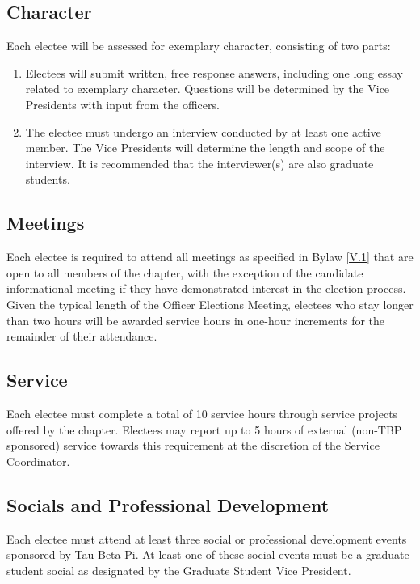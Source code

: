 
\subsection{Character} \label{B.1}

Each electee will be assessed for exemplary character, consisting of two parts:
\begin{enumerate}
    \item {} Electees will submit written, free response answers, including one long essay related to exemplary character. 
    Questions will be determined by the Vice Presidents with input from the officers.
    \item {} The electee must undergo an interview conducted by at least one active member. The Vice Presidents will determine the length and scope of the interview. 
    It is recommended that the interviewer(s) are also graduate students. 
\end{enumerate}


\subsection{Meetings} \label{B.2}

Each electee is required to attend all meetings as specified in Bylaw \ref{V.1} that are open to all members of the chapter, with the exception of the 
candidate informational meeting if they have demonstrated interest in the election process. Given the typical length of the Officer Elections Meeting, 
electees who stay longer than two hours will be awarded service hours in one-hour increments for the remainder of their attendance. 


\subsection{Service} \label{B.3}

Each electee must complete a total of 10 service hours through service projects offered by the chapter. 
Electees may report up to 5 hours of external (non-TBP sponsored) service towards this requirement at the discretion of the Service Coordinator.

\subsection{Socials and Professional Development} \label{B.4}

Each electee must attend at least three social or professional development events sponsored by Tau Beta Pi. 
At least one of these social events must be a graduate student social as designated by the Graduate Student Vice President.

